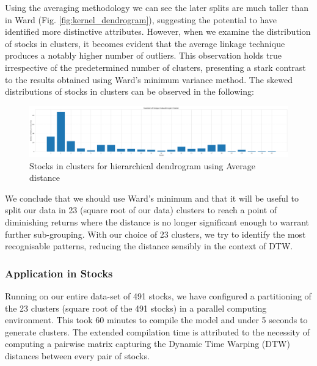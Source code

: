 \documentclass[11pt]{article}
\begin{document}
Using the averaging methodology we can see the later splits are much taller than in Ward (Fig. \ref{fig:kernel_dendrogram}), suggesting the potential to have identified more distinctive attributes. However, when we examine the distribution of stocks in clusters, it becomes evident that the average linkage technique produces a notably higher number of outliers. This observation holds true irrespective of the predetermined number of clusters, presenting a stark contrast to the results obtained using Ward's minimum variance method. The skewed distributions of stocks in clusters can be observed in the following:

\begin{figure}[H]
\centering
\includegraphics[width=12cm]{img/hierarchical_average.png} 
\caption{Stocks in clusters for hierarchical dendrogram using Average distance}
\label{fig:average_dendrogram}
\end{figure}

We conclude that we should use Ward's minimum and that it will be useful to split our data in 23 (square root of our data) clusters to reach a point of diminishing returns where the distance is no longer significant enough to warrant further sub-grouping. With our choice of 23 clusters, we try to identify the most recognisable patterns, reducing the distance sensibly in the context of DTW.

\subsubsection{Application in Stocks}

Running on our entire data-set of 491 stocks, we have  configured a partitioning of the 23 clusters (square root of the 491 stocks) in a parallel computing environment. This took 60 minutes to compile the model and under 5 seconds to generate clusters. The extended compilation time is attributed to the necessity of computing a pairwise matrix capturing the Dynamic Time Warping (DTW) distances between every pair of stocks.
\end{document}
